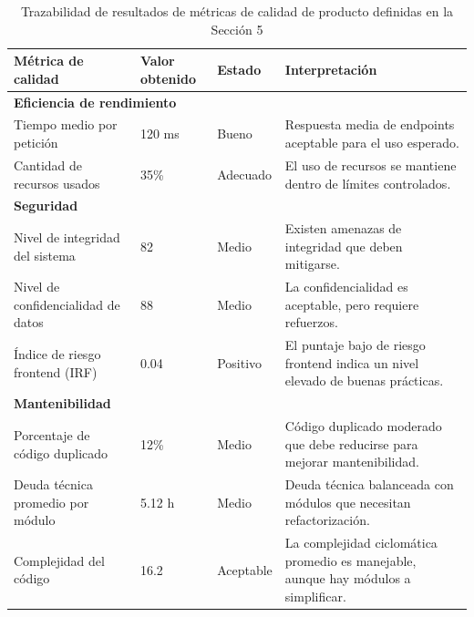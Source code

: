 \begin{table}[H]
    \centering
    \scriptsize
    \begin{tabular}{|p{4cm}|p{3cm}|p{3cm}|p{5cm}|}
        \hline
        \textbf{Métrica de calidad}        & \textbf{Valor obtenido} & \textbf{Estado} & \textbf{Interpretación}                                                             \\
        \hline
        \multicolumn{4}{|l|}{\textbf{Eficiencia de rendimiento}}                                                                                                             \\
        \hline
        Tiempo medio por petición          & 120 ms                  & Bueno           & Respuesta media de endpoints aceptable para el uso esperado.                        \\
        \hline
        Cantidad de recursos usados        & 35\%                    & Adecuado        & El uso de recursos se mantiene dentro de límites controlados.                       \\
        \hline
        \multicolumn{4}{|l|}{\textbf{Seguridad}}                                                                                                                             \\
        \hline
        Nivel de integridad del sistema    & 82                      & Medio           & Existen amenazas de integridad que deben mitigarse.                                 \\
        \hline
        Nivel de confidencialidad de datos & 88                      & Medio           & La confidencialidad es aceptable, pero requiere refuerzos.                          \\
        \hline
        Índice de riesgo frontend (IRF)    & 0.04                    & Positivo           & El puntaje bajo de riesgo frontend indica un nivel elevado de buenas prácticas.     \\
        \hline
        \multicolumn{4}{|l|}{\textbf{Mantenibilidad}}                                                                                                                        \\
        \hline
        Porcentaje de código duplicado     & 12\%                    & Medio           & Código duplicado moderado que debe reducirse para mejorar mantenibilidad.           \\
        \hline
        Deuda técnica promedio por módulo  & 5.12 h                   & Medio           & Deuda técnica balanceada con módulos que necesitan refactorización.                \\
        \hline
        Complejidad del código             & 16.2                     & Aceptable       & La complejidad ciclomática promedio es manejable, aunque hay módulos a simplificar. \\
        \hline
    \end{tabular}
    \caption{Trazabilidad de resultados de métricas de calidad de producto definidas en la Sección 5}
    \label{tab:trazabilidad_metricas_producto}
\end{table}

